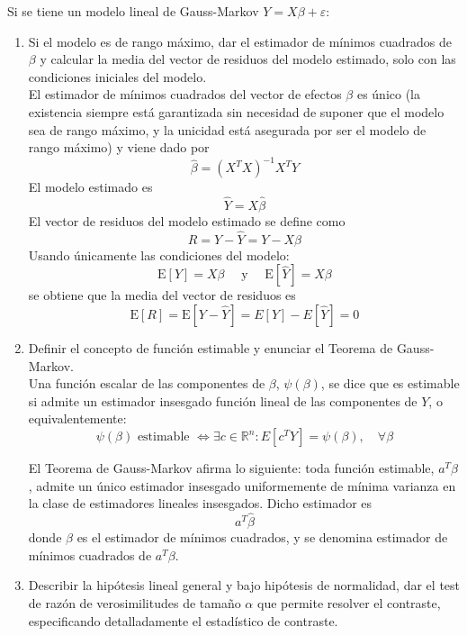 \documentclass[12pt]{article}
\newcommand{\E}{\mathrm{E}}
\newcommand{\R}{\mathbb{R}}
\begin{document}
    \newpage

    \begin{ejercicio}[1.25 puntos]
        Si se tiene un modelo lineal de Gauss-Markov $Y=X\beta + \varepsilon$:
        \begin{enumerate}[label=\alph*)]
            \item Si el modelo es de rango máximo, dar el estimador de mínimos cuadrados de $\beta$ y calcular la media del vector de residuos del modelo estimado, solo con las condiciones iniciales del modelo. \\
            
            El estimador de mínimos cuadrados del vector de efectos $\beta$ es único (la existencia siempre está garantizada sin necesidad de suponer que el modelo sea de rango máximo, y la unicidad está asegurada por ser el modelo de rango
            máximo) y viene dado por 
            $$\hat{\beta} = (X^T X)^{-1} X^T Y$$
            El modelo estimado es
            $$\hat{Y} = X \hat{\beta}$$
            El vector de residuos del modelo estimado se define como
            $$R = Y - \hat{Y} = Y - X \hat{\beta}$$
            Usando únicamente las condiciones del modelo:
            $$\E[Y] = X \beta \quad \text{ y } \quad \E[\hat{Y}] = X \beta$$
            se obtiene que la media del vector de residuos es 
            $$\E[R] = \E[Y - \hat{Y}] = E[Y] - E[\hat{Y}] = 0$$
            
            \item Definir el concepto de función estimable y enunciar el Teorema de Gauss-Markov. \\
            
            Una función escalar de las componentes de $\beta$, $\psi(\beta)$, se dice que es estimable si admite
            un estimador insesgado función lineal de las componentes de $Y$, o equivalentemente:
            $$\psi(\beta) \text{ estimable } \iff \exists c \in \R^n : E[c^T Y] = \psi(\beta), \quad \forall \beta$$

            El Teorema de Gauss-Markov afirma lo siguiente: toda función estimable, $a^T \beta$, admite un único estimador
            insesgado uniformemente de mínima varianza en la clase de estimadores lineales insesgados. Dicho estimador es
            $$a^T \hat{\beta}$$
            donde $\hat{\beta}$ es el estimador de mínimos cuadrados, y se denomina estimador de mínimos cuadrados de $a^T \beta$.

            \newpage
            
            \item Describir la hipótesis lineal general y bajo hipótesis de normalidad, dar el test de razón de verosimilitudes de tamaño $\alpha$ que permite resolver el contraste, especificando detalladamente el estadístico de contraste. \\
            

\end{enumerate}
\end{ejercicio}
\end{document}
